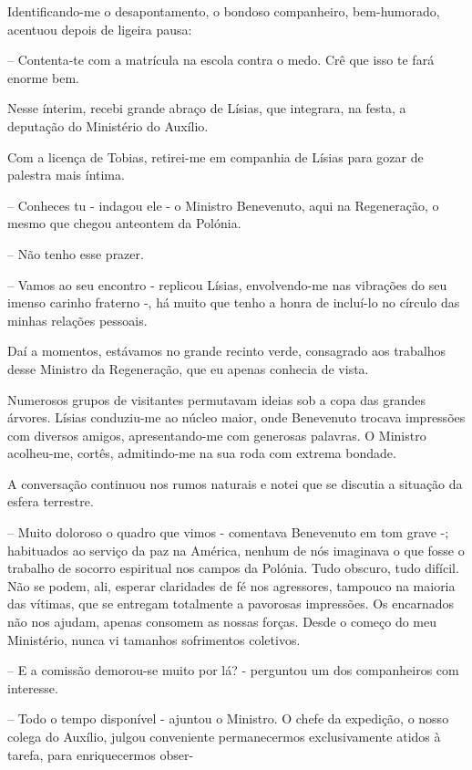\documentclass[portuguese,12pt,a4paper]{scrbook}
\begin{document}
	Identificando-me o desapontamento, o bondoso companheiro, bem-humorado, acentuou depois de ligeira pausa:
	
	– Contenta-te com a matrícula na escola contra o medo. Crê que isso te fará enorme bem.
	
	Nesse ínterim, recebi grande abraço de Lísias, que integrara, na festa, a deputação do Ministério do Auxílio.
	
	Com a licença de Tobias, retirei-me em companhia de Lísias para gozar de palestra mais íntima.
	
	
	– Conheces tu - indagou ele - o Ministro Benevenuto, aqui na Regeneração, o mesmo que chegou anteontem da Polónia.
	
	– Não tenho esse prazer.
	
	– Vamos ao seu encontro - replicou Lísias, envolvendo-me nas vibrações do seu imenso carinho fraterno -, há muito que tenho a honra de incluí-lo no círculo das minhas relações pessoais.
	
	Daí a momentos, estávamos no grande recinto verde, consagrado aos trabalhos desse Ministro da Regeneração, que eu apenas conhecia de vista.
	
	Numerosos grupos de visitantes permutavam ideias sob a copa das grandes árvores. Lísias conduziu-me ao núcleo maior, onde Benevenuto trocava impressões com diversos amigos, apresentando-me com generosas palavras. O Ministro acolheu-me, cortês, admitindo-me na sua roda com extrema bondade.
	
	A conversação continuou nos rumos naturais e notei que se discutia a situação da esfera terrestre.
	
	– Muito doloroso o quadro que vimos - comentava Benevenuto em tom grave -; habituados ao serviço da paz na América, nenhum de nós imaginava o que fosse o trabalho de socorro espiritual nos campos da Polónia. Tudo obscuro, tudo difícil. Não se podem, ali, esperar claridades de fé nos agressores, tampouco na maioria das vítimas, que se entregam totalmente a pavorosas impressões. Os encarnados não nos ajudam, apenas consomem as nossas forças. Desde o começo do meu Ministério, nunca vi tamanhos sofrimentos coletivos.
	
	– E a comissão demorou-se muito por lá? - perguntou um dos companheiros com interesse.
	
	– Todo o tempo disponível - ajuntou o Ministro. O chefe da expedição, o nosso colega do Auxílio, julgou conveniente permanecermos exclusivamente atidos à tarefa, para enriquecermos obser-
	
\end{document}
